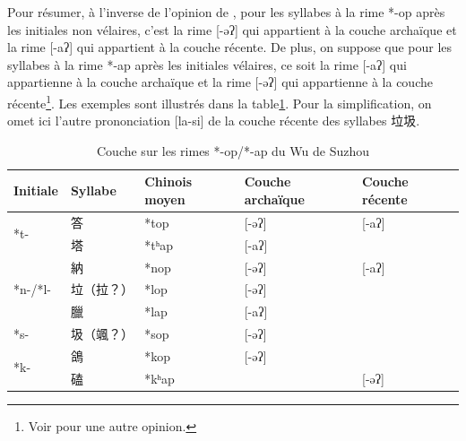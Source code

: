 \documentclass{scrbook}
\newcounter{c}[subsubsection]
\newcommand{\illustre}{Les exemples sont illustrés dans la table\xspace}
\begin{document}
\begin{sloppypar}
Pour résumer, à l'inverse de l'opinion de \textcite[23]{Ye1988suzhou}, pour les syllabes à la rime *-op après les initiales non vélaires, c'est la rime [-əʔ] qui appartient à la couche archaïque et la rime [-aʔ] qui appartient à la couche récente. De plus, on suppose que pour les syllabes à la rime *-ap après les initiales vélaires, ce soit la rime [-aʔ] qui appartienne à la couche archaïque et la rime [-əʔ] qui appartienne à la couche récente\footnote{Voir \textcite{Shi2019wu_sud_tan} pour une autre opinion.}. \illustre \ref{tab:couche_op_ap_suzhou}. Pour la simplification, on omet ici l'autre prononciation [la-si] de la couche récente des syllabes 垃圾.

\begin{table}[htbp]
  \centering
    \begin{tabular}{lllll}
    \toprule
    Initiale & Syllabe & Chinois moyen  & Couche archaïque & \multicolumn{1}{l}{Couche récente} \\
    \midrule
    \multirow{2}[2]{*}{*t-} & 答     & *top  & [-əʔ] & \multicolumn{1}{l}{[-aʔ]} \\
          & \cellcolor[rgb]{ .851,  .851,  .851}塔 & \cellcolor[rgb]{ .851,  .851,  .851}*tʰap & \cellcolor[rgb]{ .851,  .851,  .851}[-aʔ] & \cellcolor[rgb]{ .851,  .851,  .851} \\
    \midrule
    \multirow{3}[2]{*}{*n-/*l-} & 納     & *nop  & [-əʔ] & \multicolumn{1}{l}{[-aʔ]} \\
          & 垃（拉？） & *lop  & [-əʔ] &  \\
          & \cellcolor[rgb]{ .851,  .851,  .851}臘 & \cellcolor[rgb]{ .851,  .851,  .851}*lap & \cellcolor[rgb]{ .851,  .851,  .851}[-aʔ] & \cellcolor[rgb]{ .851,  .851,  .851} \\
    \midrule
    *s-   & 圾（颯？） & *sop  & [-əʔ] &  \\
    \midrule
    \multirow{2}[2]{*}{*k-} & 鴿     & *kop  & [-əʔ] &  \\
          & \cellcolor[rgb]{ .851,  .851,  .851}磕 & \cellcolor[rgb]{ .851,  .851,  .851}*kʰap & \cellcolor[rgb]{ .851,  .851,  .851} & \cellcolor[rgb]{ .851,  .851,  .851} [-əʔ]\\
    \bottomrule
    \end{tabular}%
  \caption{Couche sur les rimes *-op/*-ap du Wu de Suzhou}
  \label{tab:couche_op_ap_suzhou}%
\end{table}%


\end{sloppypar}
\end{document}
